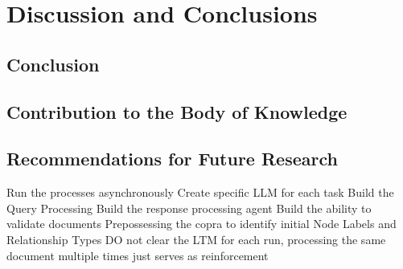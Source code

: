 \chapter{Discussion and Conclusions}
\section{Conclusion}
\lipsum[1]

\section{Contribution to the Body of Knowledge}
\lipsum[1]

\section{Recommendations for Future Research}

Run the processes asynchronously
Create specific LLM for each task
Build the Query Processing
Build the response processing agent
Build the ability to validate documents
Prepossessing the copra to identify initial Node Labels and Relationship Types
DO not clear the LTM for each run, processing the same document multiple times just serves as reinforcement

\lipsum[1] 